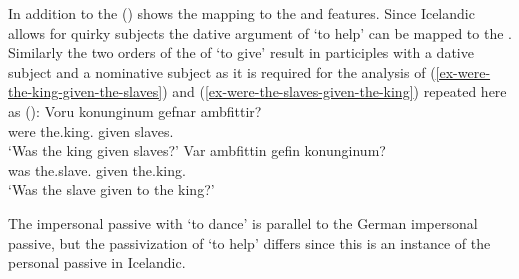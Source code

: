 \ea\label{da-repr-hm-Danish-two}
\z{}
In addition to the \argstl () shows the mapping to the \spr and \comps features. Since
Icelandic allows for quirky subjects the dative argument of `to help' can be mapped to the
\sprl \citep[--148]{Wechsler95a-u}. Similarly the two orders of the \argst of `to give' result in participles with a dative
subject and a nominative subject as it is required for the analysis of (\ref{ex-were-the-king-given-the-slaves}) and (\ref{ex-were-the-slaves-given-the-king}) repeated
here as ():
\eal
\ex\label{ex-were-the-king-given-the-slaves-two}
\gll Voru konunginum gefnar ambfittir?\\
     were the.king.\DAT{} given slaves.\NOM{}\\
\glt `Was the king given slaves?'
\ex\label{ex-were-the-slaves-given-the-king-two}
\gll Var ambfittin gefin konunginum?\\
     was the.slave.\NOM{} given the.king.\DAT\\
\glt `Was the slave given to the king?'
\zl

The impersonal passive with `to dance' is parallel to the German impersonal passive, but the
passivization of `to help' differs since this is an instance of the personal passive in Icelandic.


